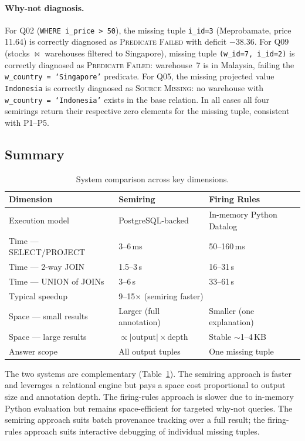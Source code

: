 \documentclass{llncs}
\begin{document}
\paragraph{Why-not diagnosis.}
For Q02 (\texttt{WHERE i\_price > 50}), the missing tuple
\texttt{i\_id=3} (Meprobamate, price 11.64) is correctly diagnosed
as \textsc{Predicate Failed} with deficit $-38.36$.
For Q09 (stocks $\bowtie$ warehouses filtered to Singapore), missing
tuple \texttt{(w\_id=7, i\_id=2)} is correctly diagnosed as
\textsc{Predicate Failed}: warehouse~7 is in Malaysia, failing the
\texttt{w\_country = `Singapore'} predicate.
For Q05, the missing projected value \texttt{Indonesia} is correctly
diagnosed as \textsc{Source Missing}: no warehouse with
\texttt{w\_country = `Indonesia'} exists in the base relation.
In all cases all four semirings return their respective zero elements
for the missing tuple, consistent with P1--P5.

\subsection{Summary}

\begin{table}[t]
\centering
\caption{System comparison across key dimensions.}
\label{tab:summary}
\begin{tabular}{lll}
\toprule
\textbf{Dimension} & \textbf{Semiring} & \textbf{Firing Rules} \\
\midrule
Execution model     & PostgreSQL-backed & In-memory Python Datalog \\
Time --- SELECT/PROJECT & 3--6\,ms      & 50--160\,ms \\
Time --- 2-way JOIN     & 1.5--3\,s     & 16--31\,s \\
Time --- UNION of JOINs & 3--6\,s       & 33--61\,s \\
Typical speedup         & \multicolumn{2}{l}{9--15$\times$ (semiring faster)} \\
Space --- small results & Larger (full annotation) & Smaller (one explanation) \\
Space --- large results & $\propto |\text{output}| \times \text{depth}$ & Stable $\sim$1--4\,KB \\
Answer scope            & All output tuples & One missing tuple \\
\bottomrule
\end{tabular}
\end{table}

The two systems are complementary (Table~\ref{tab:summary}).
The semiring approach is faster and leverages a relational engine but
pays a space cost proportional to output size and annotation depth.
The firing-rules approach is slower due to in-memory Python evaluation
but remains space-efficient for targeted why-not queries.
The semiring approach suits batch provenance tracking over a full
result; the firing-rules approach suits interactive debugging of
individual missing tuples.
\end{document}
